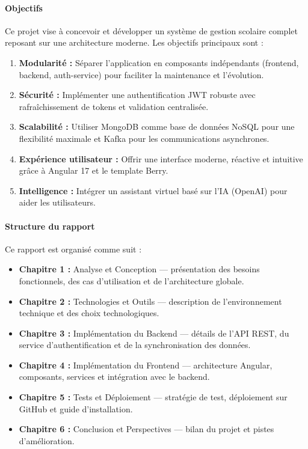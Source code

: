 \documentclass[12pt,a4paper,twoside]{report}
\begin{document}
\paragraph{Objectifs}
Ce projet vise à concevoir et développer un système de gestion scolaire complet reposant sur une architecture moderne. Les objectifs principaux sont :
\begin{enumerate}[leftmargin=*]
  \item \textbf{Modularité :} Séparer l'application en composants indépendants (frontend, backend, auth-service) pour faciliter la maintenance et l'évolution.
  \item \textbf{Sécurité :} Implémenter une authentification JWT robuste avec rafraîchissement de tokens et validation centralisée.
  \item \textbf{Scalabilité :} Utiliser MongoDB comme base de données NoSQL pour une flexibilité maximale et Kafka pour les communications asynchrones.
  \item \textbf{Expérience utilisateur :} Offrir une interface moderne, réactive et intuitive grâce à Angular 17 et le template Berry.
  \item \textbf{Intelligence :} Intégrer un assistant virtuel basé sur l'IA (OpenAI) pour aider les utilisateurs.
\end{enumerate}

\paragraph{Structure du rapport}
Ce rapport est organisé comme suit :
\begin{itemize}[leftmargin=*]
  \item \textbf{Chapitre 1 :} Analyse et Conception — présentation des besoins fonctionnels, des cas d'utilisation et de l'architecture globale.
  \item \textbf{Chapitre 2 :} Technologies et Outils — description de l'environnement technique et des choix technologiques.
  \item \textbf{Chapitre 3 :} Implémentation du Backend — détails de l'API REST, du service d'authentification et de la synchronisation des données.
  \item \textbf{Chapitre 4 :} Implémentation du Frontend — architecture Angular, composants, services et intégration avec le backend.
  \item \textbf{Chapitre 5 :} Tests et Déploiement — stratégie de test, déploiement sur GitHub et guide d'installation.
  \item \textbf{Chapitre 6 :} Conclusion et Perspectives — bilan du projet et pistes d'amélioration.
\end{itemize}
\end{document}
